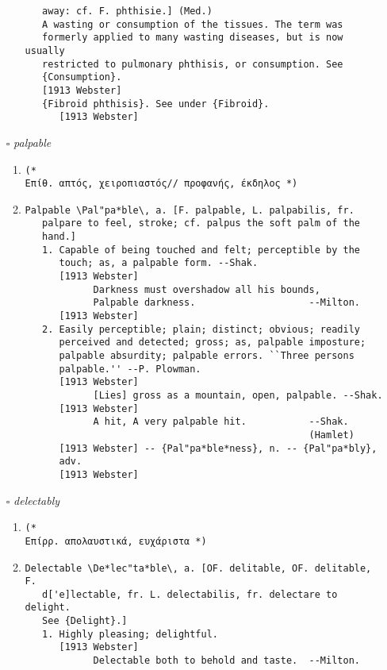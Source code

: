 \documentclass{article}
\begin{document}
\begin{itemize}
\begin{enumerate}
{\begin{lstlisting}
   away: cf. F. phthisie.] (Med.)
   A wasting or consumption of the tissues. The term was
   formerly applied to many wasting diseases, but is now usually
   restricted to pulmonary phthisis, or consumption. See
   {Consumption}.
   [1913 Webster]
   {Fibroid phthisis}. See under {Fibroid}.
      [1913 Webster]
\end{lstlisting}}
\end{enumerate}
\item[$\square$] \emph{ palpable }
\begin{enumerate}
\item{
\begin{lstlisting}
(* 
Επίθ. απτός, χειροπιαστός// προφανής, έκδηλος *)
\end{lstlisting}}
\item{
\begin{lstlisting}
Palpable \Pal"pa*ble\, a. [F. palpable, L. palpabilis, fr.
   palpare to feel, stroke; cf. palpus the soft palm of the
   hand.]
   1. Capable of being touched and felt; perceptible by the
      touch; as, a palpable form. --Shak.
      [1913 Webster]
            Darkness must overshadow all his bounds,
            Palpable darkness.                    --Milton.
      [1913 Webster]
   2. Easily perceptible; plain; distinct; obvious; readily
      perceived and detected; gross; as, palpable imposture;
      palpable absurdity; palpable errors. ``Three persons
      palpable.'' --P. Plowman.
      [1913 Webster]
            [Lies] gross as a mountain, open, palpable. --Shak.
      [1913 Webster]
            A hit, A very palpable hit.           --Shak.
                                                  (Hamlet)
      [1913 Webster] -- {Pal"pa*ble*ness}, n. -- {Pal"pa*bly},
      adv.
      [1913 Webster]
\end{lstlisting}}
\end{enumerate}
\item[$\square$] \emph{ delectably }
\begin{enumerate}
\item{
\begin{lstlisting}
(* 
Επίρρ. απολαυστικά, ευχάριστα *)
\end{lstlisting}}
\item{
\begin{lstlisting}
Delectable \De*lec"ta*ble\, a. [OF. delitable, OF. delitable, F.
   d['e]lectable, fr. L. delectabilis, fr. delectare to delight.
   See {Delight}.]
   1. Highly pleasing; delightful.
      [1913 Webster]
            Delectable both to behold and taste.  --Milton.

\end{lstlisting}}
\end{enumerate}
\end{itemize}
\end{document}

